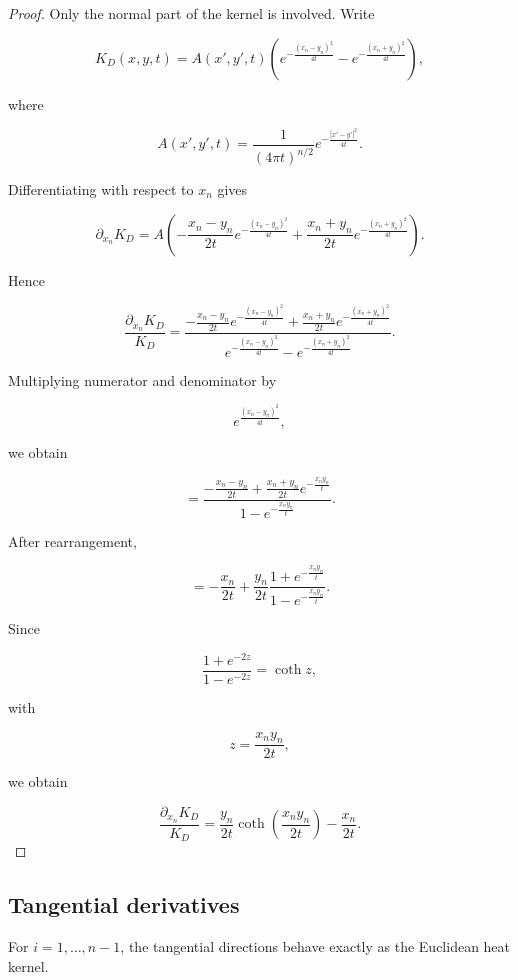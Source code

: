 \documentclass[11pt]{amsart}
\theoremstyle{definition}
\theoremstyle{remark}
\begin{document}
\begin{proof}

Only the normal part of the kernel is involved. Write

\[
K_D(x,y,t)
=
A(x',y',t)
\left(
e^{-\frac{(x_n-y_n)^2}{4t}}
-
e^{-\frac{(x_n+y_n)^2}{4t}}
\right),
\]

where

\[
A(x',y',t)
=
\frac1{(4\pi t)^{n/2}}
e^{-\frac{|x'-y'|^2}{4t}} .
\]


Differentiating with respect to $x_n$ gives

\[
\partial_{x_n}K_D
=
A
\left(
-\frac{x_n-y_n}{2t}
e^{-\frac{(x_n-y_n)^2}{4t}}
+
\frac{x_n+y_n}{2t}
e^{-\frac{(x_n+y_n)^2}{4t}}
\right).
\]


Hence

\[
\frac{\partial_{x_n}K_D}{K_D}
=
\frac{
-\frac{x_n-y_n}{2t}
e^{-\frac{(x_n-y_n)^2}{4t}}
+
\frac{x_n+y_n}{2t}
e^{-\frac{(x_n+y_n)^2}{4t}}
}
{
e^{-\frac{(x_n-y_n)^2}{4t}}
-
e^{-\frac{(x_n+y_n)^2}{4t}}
}.
\]


Multiplying numerator and denominator by

\[
e^{\frac{(x_n-y_n)^2}{4t}},
\]

we obtain

\[
=
\frac{
-\frac{x_n-y_n}{2t}
+
\frac{x_n+y_n}{2t}
e^{-\frac{x_ny_n}{t}}
}
{
1-e^{-\frac{x_ny_n}{t}}
}.
\]


After rearrangement,

\[
=
-\frac{x_n}{2t}
+
\frac{y_n}{2t}
\frac{1+e^{-\frac{x_ny_n}{t}}}
{1-e^{-\frac{x_ny_n}{t}}}.
\]

Since

\[
\frac{1+e^{-2z}}
{1-e^{-2z}}
=
\coth z ,
\]

with

\[
z=\frac{x_ny_n}{2t},
\]

we obtain

\[
\frac{\partial_{x_n}K_D}{K_D}
=
\frac{y_n}{2t}
\coth
\left(
\frac{x_ny_n}{2t}
\right)
-\frac{x_n}{2t}.
\]

\end{proof}



\subsection{Tangential derivatives}


For $i=1,\ldots,n-1$, the tangential directions behave exactly as
the Euclidean heat kernel.
\end{document}
